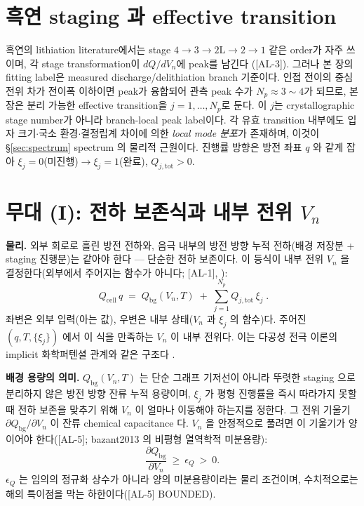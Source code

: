 \documentclass[11pt,a4paper]{article}
\newcommand{\bg}{\mathrm{bg}}
\newcommand{\cell}{\mathrm{cell}}
\newcommand{\tot}{\mathrm{tot}}
\newcommand{\AL}[1]{\textsf{[AL-#1]}}
\begin{document}
\section{흑연 staging 과 effective transition}\label{sec:staging}
흑연의 lithiation literature에서는 stage $4\to3\to2\mathrm L\to2\to1$ 같은 order가 자주 쓰이며, 각 stage transformation이 $dQ/dV_n$에 peak를
남긴다 \cite{dahn1991,ohzuku1993,funabiki1999ea,funabiki1999jes}(\AL{3}). 그러나 본 장의 fitting label은 measured discharge/delithiation branch 기준이다.
인접 전이의 중심 전위 차가 전이폭 이하이면 peak가 융합되어 관측 peak 수가 $N_p\approx3\sim4$가 되므로, 본 장은 분리 가능한 effective transition을
$j=1,\dots,N_p$로 둔다. 이 $j$는 crystallographic stage number가 아니라 branch-local peak label이다. 각 유효 transition 내부에도 입자 크기$\cdot$국소 환경$\cdot$결정립계
차이에 의한 \emph{local mode 분포}가 존재하며, 이것이 \S\ref{sec:spectrum} spectrum 의 물리적 근원이다.
진행률 방향은 방전 좌표 $q$ 와 같게 잡아 $\xi_j=0$(미진행)$\to\xi_j=1$(완료), $Q_{j,\tot}>0$.

\section{무대 (I): 전하 보존식과 내부 전위 $V_n$}\label{sec:charge}
\textbf{물리.} 외부 회로로 흘린 방전 전하와, 음극 내부의 방전 방향 누적 전하(배경 저장분 + staging 진행분)는
같아야 한다 — 단순한 전하 보존이다. 이 등식이 내부 전위 $V_n$ 을 결정한다(외부에서 주어지는 함수가
아니다; \AL{1}, \cite{doyle1993,newman}):
\begin{equation}
\boxed{\;Q_\cell\,q \;=\; Q_\bg(V_n,T) \;+\; \sum_{j=1}^{N_p} Q_{j,\tot}\,\xi_j\;.}
\label{eq:charge_balance}
\end{equation}
좌변은 외부 입력(아는 값), 우변은 내부 상태($V_n$ 과 $\xi_j$ 의 함수)다. 주어진 $(q,T,\{\xi_j\})$ 에서 이
식을 만족하는 $V_n$ 이 내부 전위다. 이는 다공성 전극 이론의 implicit 화학퍼텐셜 관계와 같은 구조다
\cite{doyle1993,newman}.

\textbf{배경 용량의 의미.} $Q_\bg(V_n,T)$ 는 단순 그래프 기저선이 아니라 뚜렷한 staging 으로 분리하지 않은
방전 방향 잔류 누적 용량이며, $\xi_j$ 가 평형 진행률을 즉시 따라가지 못할 때 전하 보존을 맞추기 위해 $V_n$
이 얼마나 이동해야 하는지를 정한다. 그 전위 기울기 $\partial Q_\bg/\partial V_n$ 이 잔류 chemical
capacitance 다. $V_n$ 을 안정적으로 풀려면 이 기울기가 양이어야 한다(\AL{5}; bazant2013 의 비평형
열역학적 미분용량):
\begin{equation}
\frac{\partial Q_\bg}{\partial V_n}\ \ge\ \epsilon_Q\ >\ 0 .
\label{eq:monotone}
\end{equation}
$\epsilon_Q$ 는 임의의 정규화 상수가 아니라 양의 미분용량이라는 물리 조건이며, 수치적으로는 해의 특이점을
막는 하한이다(\AL{5} BOUNDED).
\end{document}
